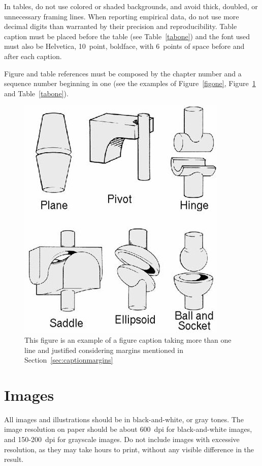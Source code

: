 \documentclass{SBCbookchapter}
\begin{document}
In tables, do not use colored or shaded backgrounds, and avoid thick,
doubled, or unnecessary framing lines. When reporting empirical data,
do not use more decimal digits than warranted by their precision and
reproducibility. Table caption must be placed before the table (see
Table~\ref{tabone}) and the font used must also be Helvetica,
10~point, boldface, with 6~points of space before and after each
caption.

Figure and table references must be composed by the chapter number and
a sequence number beginning in one (see the examples of
Figure~\ref{figone}, Figure~\ref{figtwo} and Table~\ref{tabone}).

\begin{figure}[h!]
	\centerline{\includegraphics{fig2}}
	\caption{This figure is an example of a figure caption taking
		more than one line and justified considering margins
		mentioned in Section~\ref{sec:captionmargins}}
	\label{figtwo}
\end{figure}

\section{Images}
All images and illustrations should be in black-and-white, or gray
tones. The image resolution on paper should be about 600~dpi for
black-and-white images, and 150-200~dpi for grayscale images.  Do not
include images with excessive resolution, as they may take hours to
print, without any visible difference in the result.
\end{document}
